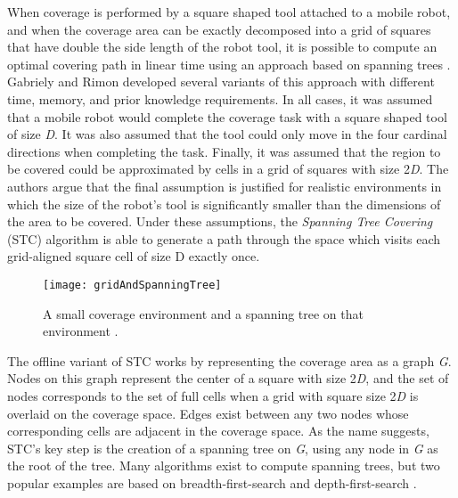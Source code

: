 When coverage is performed by a square shaped tool attached to a mobile robot, and when the coverage area can be exactly decomposed into a grid of squares that have double the side length of the robot tool, it is possible to compute an optimal covering path in linear time using an approach based on spanning trees \cite{STC}. Gabriely and Rimon developed several variants of this approach with different time, memory, and prior knowledge requirements. In all cases, it was assumed that a mobile robot would complete the coverage task with a square shaped tool of size \textit{D}. It was also assumed that the tool could only move in the four cardinal directions when completing the task. Finally, it was assumed that the region to be covered could be approximated by cells in a grid of squares with size 2\textit{D}. The authors argue that the final assumption is justified for realistic environments in which the size of the robot's tool is significantly smaller than the dimensions of the area to be covered. Under these assumptions, the \textit{Spanning Tree Covering} (STC) algorithm is able to generate a path through the space which visits each grid-aligned square cell of size D exactly once.

\begin{figure}[H]
\texttt{[image: gridAndSpanningTree]}
\caption[Spanning Tree Example]{A small coverage environment and a spanning tree on that environment \cite{STC}.}
\end{figure}

The offline variant of STC works by representing the coverage area as a graph \textit{G}. Nodes on this graph represent the center of a square with size 2\textit{D}, and the set of nodes corresponds to the set of full cells when a grid with square size 2\textit{D} is overlaid on the coverage space. Edges exist between any two nodes whose corresponding cells are adjacent in the coverage space. As the name suggests, STC's key step is the creation of a spanning tree on \textit{G}, using any node in \textit{G} as the root of the tree. Many algorithms exist to compute spanning trees, but two popular examples are based on breadth-first-search and depth-first-search \cite{CormenAlg}.

